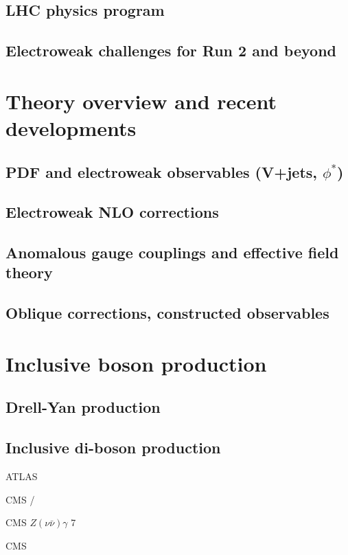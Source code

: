 \documentclass[12pt]{iopart}
\begin{document}
\subsection{LHC physics program}
\subsection{Electroweak challenges for Run 2 and beyond}

\section{Theory overview and recent developments}
\subsection{PDF and electroweak observables (V+jets, $\phi^*$)}
\subsection{Electroweak NLO corrections}
\subsection{Anomalous gauge couplings and effective field theory}
\subsection{Oblique corrections, constructed observables}


\section{Inclusive boson production}
\subsection{Drell-Yan production}
\label{ss-inclboson-drellyan}

\subsection{Inclusive di-boson production}

ATLAS \Wg {} \TeV\xspace~\cite{Aad:2013izg}

CMS \Wg/ \TeV\xspace~\cite{Chatrchyan:2013fya}

CMS $Z(\nu\bar{\nu})\gamma$ 7 \TeV~\cite{Chatrchyan:2013nda}

CMS  \TeV~\cite{Khachatryan:2015kea}
\end{document}
